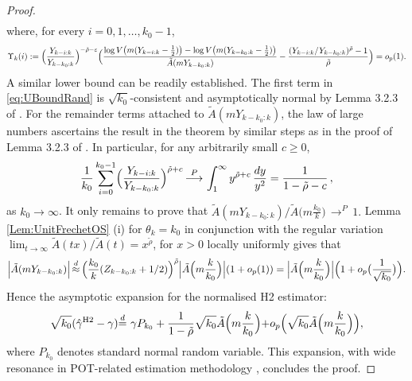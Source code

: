 \documentclass[11pt, a4paper, oneside]{article}
\numberwithin{equation}{section}
\theoremstyle{plain}
\theoremstyle{definition}
\newcommand{\id}{\ensuremath{\displaystyle{\mathop {=} ^d}}}
\newcommand{\approxid}{\ensuremath{\displaystyle{\mathop {\approx} ^d}}}
\newcommand{\sumab}[2]{\ensuremath{\sum\limits_{#1}^{#2}}}
\newcommand{\intinf}[1]{\ensuremath{\int_{#1}^{\infty}}}
\newcommand{\conv}[1]{\ensuremath{\, \displaystyle {\mathop{\longrightarrow}^{#1}}}\, }
\begin{document}
\begin{proof}
\begin{eqnarray}
\end{eqnarray}
where, for every $i=0, 1, \ldots, k_0-1$,
\begin{equation*}
	\Upsilon_k(i):= \Bigl( \frac{Y_{k-i:k} }{Y_{k-k_{0}:k}} \Bigr)^{-\tilde{\rho}- \varepsilon}\Bigl( \frac{\log V  \bigl(m(Y_{k-i:k} -\frac{1}{2})\bigr) - \log V \bigl( m (Y_{k-k_{0}:k} - \frac{1}{2}) \bigr)}{\tilde{A}(m Y_{k-k_{0}:k})}- \frac{(Y_{k-i:k} /Y_{k-k_{0}:k})^{\tilde{\rho}}-1}{\tilde{\rho}} \Bigr)= o_p(1).
\end{equation*}
A similar lower bound can be readily established. The first term in \eqref{eq:UBoundRand} is $\sqrt{k_0}$-consistent and asymptotically normal by Lemma 3.2.3 of \citet{deHaanFerreira2006}. For the remainder terms attached to $\tilde{A}(m Y_{k-k_{0}:k})$, the law of large numbers ascertains the result in the theorem by similar steps as in the proof of Lemma 3.2.3 of \citet{deHaanFerreira2006}. In particular, for any arbitrarily small $c\geq 0$,
\begin{equation*}
	\frac{1}{k_0}\sumab{i=0}{k_0-1} \Bigl( \frac{Y_{k-i:k} }{Y_{k-k_{0}:k}} \Bigr)^{\tilde{\rho}+ c}  \conv{P} \intinf{1} y^{\tilde{\rho}+ c} \, \frac{dy}{y^2} = \frac{1}{1-\tilde{\rho} - c}\, ,
\end{equation*}
as $k_0 \rightarrow \infty$. It only remains to prove that
$
     \tilde{A}(mY_{k-k_0:k})/\tilde{A}\bigl(m\frac{k_0}{k}\bigl) \conv{P} 1.
$
Lemma \ref{Lem:UnitFrechetOS} (i) for $\theta_k=k_0$ in conjunction with the regular variation $\lim_{t \rightarrow \infty}\tilde{A}(tx)/\tilde{A}(t) = x^{\tilde{\rho}}$, for $x>0$ locally uniformly gives that
\begin{equation*}
        \Bigl|\tilde{A}(mY_{k-k_0:k})\Bigl| \,\approxid\,  \Bigl(\frac{k_0}{k}(Z_{k-k_{0}:k}+1/2)\Bigl)^{\tilde{\rho}} \Bigl|\tilde{A}\Bigl(m\frac{k}{k_0}\Bigl)\Bigl|(1+o_{p}(1))=\Bigl|\tilde{A}\Bigl(m\frac{k}{k_0}\Bigl)\Bigl|\Bigl(1+o_{p}\bigl(\frac{1}{\sqrt{k_0}} \bigr)\Bigr).
\end{equation*}
Hence the asymptotic expansion for the normalised H2 estimator:
\begin{equation}\label{eq:H2FullExpansion}
     \sqrt{k_0} (\hat{\gamma}^{\textrm{H2}}-\gamma)\id \ \gamma P_{k_0}+\frac{1}{1-\tilde{\rho}}\sqrt{k_0}\tilde{A}\Bigl(m\frac{k}{k_0}\Bigl)+o_{p}\Bigr(\sqrt{k_0}\tilde{A}\Bigl(m\frac{k}{k_0}\Bigl)\Bigr),
   \end{equation}
where $P_{k_0}$ denotes standard normal random variable. This expansion, with wide resonance in POT-related estimation methodology \citep[cf.][Chp. 3]{deHaanFerreira2006}, concludes the proof.
\end{proof}
\end{document}
